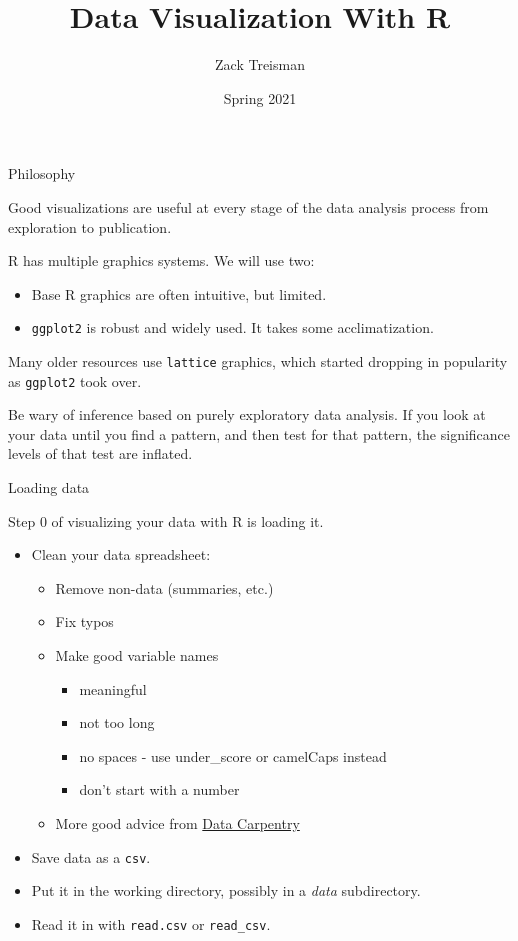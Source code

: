 \documentclass[
  ignorenonframetext,
]{beamer}
\title{Data Visualization With R}
\author{Zack Treisman}
\date{Spring 2021}
\providecommand{\tightlist}{%
  \setlength{\itemsep}{0pt}\setlength{\parskip}{0pt}}
\begin{document}
\frame{\titlepage}

\begin{frame}[fragile]{Philosophy}
\protect\hypertarget{philosophy}{}

Good visualizations are useful at every stage of the data analysis
process from exploration to publication.

R has multiple graphics systems. We will use two:

\begin{itemize}
\tightlist
\item
  Base R graphics are often intuitive, but limited.
\item
  \texttt{ggplot2} is robust and widely used. It takes some
  acclimatization.
\end{itemize}

Many older resources use \texttt{lattice} graphics, which started
dropping in popularity as \texttt{ggplot2} took over.

Be wary of inference based on purely exploratory data analysis. If you
look at your data until you find a pattern, and then test for that
pattern, the significance levels of that test are inflated.

\end{frame}

\begin{frame}[fragile]{Loading data}
\protect\hypertarget{loading-data}{}

Step 0 of visualizing your data with R is loading it.

\begin{itemize}
\tightlist
\item
  Clean your data spreadsheet:

  \begin{itemize}
  \tightlist
  \item
    Remove non-data (summaries, etc.)
  \item
    Fix typos
  \item
    Make good variable names

    \begin{itemize}
    \tightlist
    \item
      meaningful
    \item
      not too long
    \item
      no spaces - use under\_score or camelCaps instead
    \item
      don't start with a number
    \end{itemize}
  \item
    More good advice from
    \href{https://datacarpentry.org/spreadsheet-ecology-lesson/}{Data
    Carpentry}
  \end{itemize}
\item
  Save data as a \texttt{csv}.
\item
  Put it in the working directory, possibly in a \emph{data}
  subdirectory.
\item
  Read it in with \texttt{read.csv} or \texttt{read\_csv}.
\end{itemize}

\end{frame}
\end{document}
